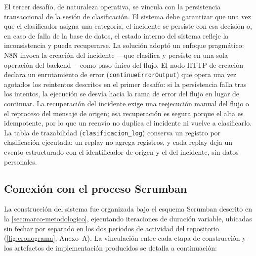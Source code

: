 El tercer desafío, de naturaleza operativa, se vincula con la persistencia transaccional de la sesión de clasificación. El sistema debe garantizar que una vez que el clasificador asigna una categoría, el incidente se persiste con esa decisión o, en caso de falla de la base de datos, el estado interno del sistema refleje la inconsistencia y pueda recuperarse. La solución adoptó un enfoque pragmático: N8N invoca la creación del incidente ---que clasifica y persiste en una sola operación del backend--- como paso único del flujo. El nodo HTTP de creación declara un enrutamiento de error (\texttt{continueErrorOutput}) que opera una vez agotados los reintentos descritos en el primer desafío: si la persistencia falla tras los intentos, la ejecución se desvía hacia la rama de error del flujo en lugar de continuar. La recuperación del incidente exige una reejecución manual del flujo o el reproceso del mensaje de origen; esa recuperación es segura porque el alta es idempotente, por lo que un reenvío no duplica el incidente ni vuelve a clasificarlo. La tabla de trazabilidad (\texttt{clasificacion\_log}) conserva un registro por clasificación ejecutada: un replay no agrega registros, y cada replay deja un evento estructurado con el identificador de origen y el del incidente, sin datos personales.

\subsection{Conexión con el proceso Scrumban}\label{subsec:conexion-scrumban}

La construcción del sistema fue organizada bajo el esquema Scrumban descrito en la \autoref{sec:marco-metodologico}, ejecutando iteraciones de duración variable, ubicadas sin fechar por separado en los dos períodos de actividad del repositorio (\autoref{fig:cronograma}, Anexo~A). La vinculación entre cada etapa de construcción y los artefactos de implementación producidos se detalla a continuación:

